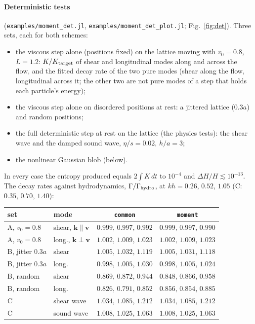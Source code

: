 \documentclass[11pt,aps,preprint,nofootinbib,superscriptaddress,tightenlines]{revtex4-2}
\def\Fig#1{Fig.~\ref{#1}}
\let\oldparagraph\paragraph
\renewcommand{\paragraph}{\par\bigskip\oldparagraph}
\begin{document}
\paragraph{Deterministic tests} (\texttt{examples/moment\_det.jl}, \texttt{examples/moment\_det\_plot.jl}; \Fig{fig:det}).  Three sets, each for both
schemes:
\begin{itemize}
\item[A.] the viscous step alone (positions fixed) on the lattice moving with $v_0=0.8$, $L=1.2$: $K/K_{\rm target}$ of shear and longitudinal modes
  along and across the flow, and the fitted decay rate of the two pure modes (shear along the flow, longitudinal across it; the
  other two are not pure modes of a step that holds each particle's energy);
\item[B.] the viscous step alone on disordered positions at rest: a jittered lattice ($0.3a$) and random positions;
\item[C.] the full deterministic step at rest on the lattice (the physics tests): the shear wave and the damped sound wave, $\eta/s=0.02$,
  $h/a=3$;
\item[D.] the nonlinear Gaussian blob (below).
\end{itemize}
In every case the entropy produced equals $2\int K\,dt$ to $10^{-4}$ and $\Delta H/H\lesssim10^{-13}$.  The decay rates against hydrodynamics,
$\Gamma/\Gamma_{\rm hydro}$, at $kh=0.26$, $0.52$, $1.05$ (C: $0.35$, $0.70$, $1.40$):
\begin{center}
\begin{tabular}{llcc}
\hline
set & mode & \texttt{common} & \texttt{moment} \\ \hline
A, $v_0=0.8$ & shear, $\bm k\parallel\bm v$ & $0.999$, $0.997$, $0.992$ & $0.999$, $0.997$, $0.990$ \\
A, $v_0=0.8$ & long., $\bm k\perp\bm v$ & $1.002$, $1.009$, $1.023$ & $1.002$, $1.009$, $1.023$ \\
B, jitter $0.3a$ & shear & $1.005$, $1.032$, $1.119$ & $1.005$, $1.031$, $1.118$ \\
B, jitter $0.3a$ & long. & $0.998$, $1.005$, $1.030$ & $0.998$, $1.005$, $1.024$ \\
B, random & shear & $0.869$, $0.872$, $0.944$ & $0.848$, $0.866$, $0.958$ \\
B, random & long. & $0.826$, $0.791$, $0.852$ & $0.856$, $0.854$, $0.885$ \\
C & shear wave & $1.034$, $1.085$, $1.212$ & $1.034$, $1.085$, $1.212$ \\
C & sound wave & $1.008$, $1.025$, $1.063$ & $1.008$, $1.025$, $1.063$ \\
\hline
\end{tabular}
\end{center}
\end{document}
